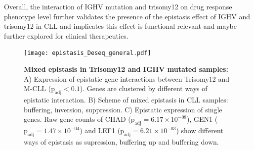 Overall, the interaction of IGHV mutation and trisomy12 on drug response phenotype level further validates the presence of the epistasis effect of IGHV and trisomy12 in CLL and implicates this effect is functional relevant and maybe further explored for clinical therapeutics. 
\clearpage


\begin{figure}
  \centering
  \texttt{[image: epistasis\_Deseq\_general.pdf]}
  \caption{\textbf{Mixed epistasis in Trisomy12 and IGHV mutated samples:} A) Expression of epistatic gene interactions between Trisomy12 and M-CLL ($\text{p}_\text{adj} < 0.1$). Genes are clustered by different ways of epistatic interaction. B) Scheme of mixed epistasis in CLL samples: buffering, inversion, suppression. C) Epistatic expression of single genes. Raw gene counts of CHAD ($\text{p}_\text{adj} = 6.17\times10^{-08}$), GEN1 ($\text{p}_\text{adj} = 1.47\times10^{-04}$) and LEF1 ($\text{p}_\text{adj} = 6.21\times10^{-03}$) show different ways of epistasis as supression, buffering up and buffering down.}
  \label{fig:mixed_epistasis}
\end{figure}

\clearpage




